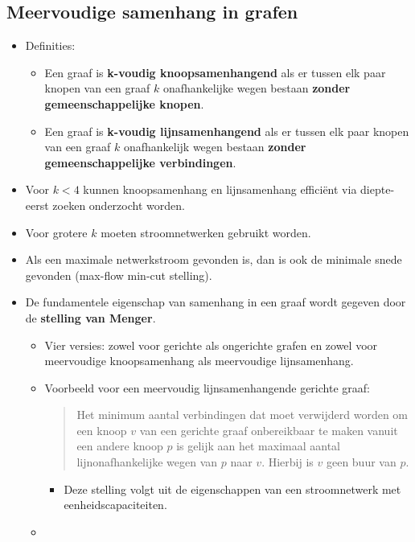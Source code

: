\subsection{Meervoudige samenhang in grafen}
\begin{itemize}
    \item Definities:
    \begin{itemize}
        \item Een graaf is \textbf{k-voudig knoopsamenhangend} als er tussen elk paar knopen van een graaf $k$ onafhankelijke wegen bestaan \textbf{zonder gemeenschappelijke knopen}.
        \item Een graaf is \textbf{k-voudig lijnsamenhangend} als er tussen elk paar knopen van een graaf $k$ onafhankelijk wegen bestaan \textbf{zonder gemeenschappelijke verbindingen}.
    \end{itemize}
    \item Voor $k < 4$ kunnen knoopsamenhang en lijnsamenhang efficiënt via diepte-eerst zoeken onderzocht worden.
    \item Voor grotere $k$ moeten stroomnetwerken gebruikt worden.
    \item Als een maximale netwerkstroom gevonden is, dan is ook de minimale snede gevonden (max-flow min-cut stelling).
    \item De fundamentele eigenschap van samenhang in een graaf wordt gegeven door de \textbf{stelling van Menger}.
    \begin{itemize}
        \item Vier versies: zowel voor gerichte als ongerichte grafen en zowel voor meervoudige knoopsamenhang als meervoudige lijnsamenhang.
        \item Voorbeeld voor een meervoudig lijnsamenhangende gerichte graaf:
        
        \begin{quote}
            Het minimum aantal verbindingen dat moet verwijderd worden om een knoop $v$ van een gerichte graaf onbereikbaar te maken vanuit een andere knoop $p$ is gelijk aan het maximaal aantal lijnonafhankelijke wegen van $p$ naar $v$. Hierbij is $v$ geen buur van $p$.
        \end{quote}
        \begin{itemize}
            \item Deze stelling volgt uit de eigenschappen van een stroomnetwerk met eenheidscapaciteiten.
        \end{itemize}
        \item 
    \end{itemize}
\end{itemize}